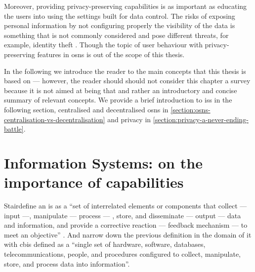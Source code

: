 \documentclass[showtrims,oldfontcommands]{kthesis}
\begin{document}
Moreover, providing privacy-preserving capabilities is as important as educating 
the users into using the settings built for data control. The risks of exposing 
personal information by not configuring properly the visibility of the data is something 
that is not commonly considered and pose different threats, for example, identity 
theft \cite{GrossAH05, BrandtzaegLS10}. Though the topic of user behaviour with 
privacy-preserving features in \acp{osn} is out of the scope of this thesis.

In the following 
we introduce the reader to the main concepts that this thesis is based on --- however,
the reader should should not consider this chapter a survey because it is not aimed 
at being that and rather an introductory and concise summary of relevant concepts. 
We provide a brief introduction to \acp{is} in the following section,
centralised and decentralised \acp{osn} in \cref{section:osns-centralisation-vs-decentralisation}
and privacy in \cref{section:privacy-a-never-ending-battle}.

\section{Information Systems: on the importance of capabilities}
    \label{section:information-systems-on-the-importance-of-capabilities}

Stair\etal define an \ac{is} as a ``set of interrelated elements or components 
that collect --- input ---, manipulate --- process --- , store, and disseminate 
--- output --- data and information, and provide a corrective reaction --- feedback 
mechanism --- to meet an objective'' \cite{StairR15}. And narrow down the previous 
definition in the domain of \ac{it} with \ac{cbis} defined as a ``single set of 
hardware, software, databases, telecommunications, people, and procedures configured 
to collect, manipulate, store, and process data into information''. 
\end{document}
